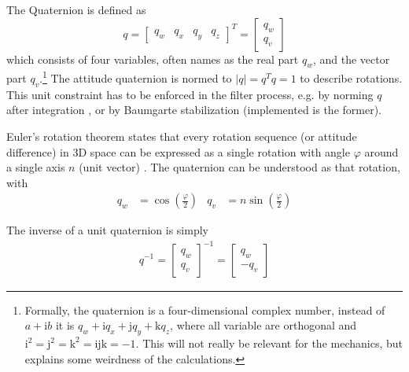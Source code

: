 The Quaternion is defined as  
\begin{equation}
    q = \begin{bmatrix}
        q_w & q_x & q_y & q_z 
    \end{bmatrix}^T = 
    \begin{bmatrix}
        q_w \\ q_v
    \end{bmatrix}
\end{equation}
which consists of four variables, often names as the real part $q_w$, and the vector part $q_v$.\footnote{Formally, the quaternion is a four-dimensional complex number, instead of $a+\mathrm{i}b$ it is $q_w + \mathrm{i} q_x + \mathrm{j} q_y + \mathrm{k} q_z$, where all variable are orthogonal and $\mathrm{i}^2 = \mathrm{j}^2 = \mathrm{k}^2 = \mathrm{ijk} = -1$. This will not really be relevant for the mechanics, but explains some weirdness of the calculations.}
The attitude quaternion is normed to $|q| = q^T q =  1$ to describe rotations.
This unit constraint has to be enforced in the filter process, e.g. by norming $q$ after integration \cite{sola2017}, or by Baumgarte stabilization (implemented is the former).

Euler's rotation theorem states that every rotation sequence (or attitude difference) in 3D space can be expressed as a single rotation with angle $\varphi$ around a single axis $n$ (unit vector) \cite{zipfel2007}.
The quaternion can be understood as that rotation, with
\begin{align}
    q_w &= \cos(\frac{\varphi}{2}) 
    &
    q_v &= n \sin(\frac{\varphi}{2})
    \label{eq:rotation-theorem}
\end{align}

The inverse of a unit quaternion is simply \cite{stevens2015}
\begin{align}
    q^{-1} = \begin{bmatrix}
        q_w \\ q_v
    \end{bmatrix}^{-1} = \begin{bmatrix}
        q_w \\ -q_v
    \end{bmatrix}
\end{align}

